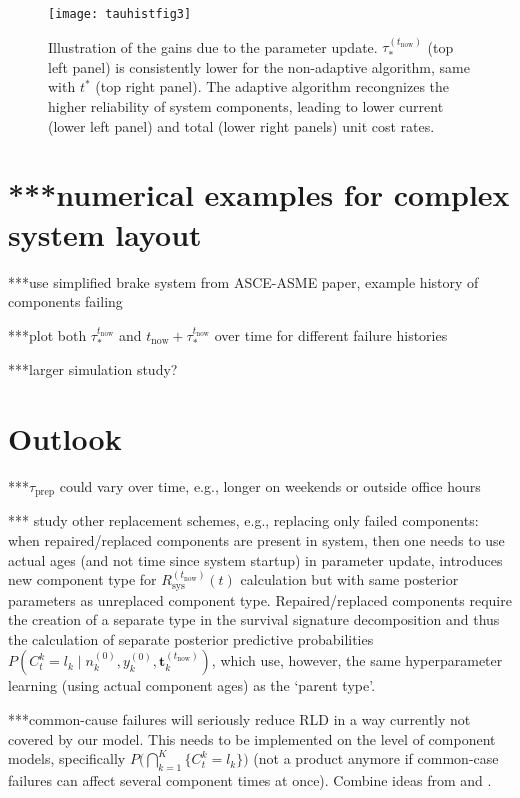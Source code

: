 \documentclass[authoryear]{elsarticle}
\renewcommand{\vec}[1]{{\bm#1}}
\newcommand{\uz}{^{(0)}} %
\def\ykz{y\uz_k}
\def\nkz{n\uz_k}
\def\tnow{t_\text{now}}
\newcommand{\Rsysnow}{R^{(t_\text{now})}_\text{sys}}
\def\vectknow{\vec{t}_k^{(\tnow)}}
\newcommand{\tausnow}{\tau_*^{(\tnow)}}
\newcommand{\tprep}{\tau_{\text{prep}}}
\begin{document}
\begin{figure}
\texttt{[image: tauhistfig3]}
\caption{Illustration of the gains due to the parameter update.
$\tausnow$ (top left panel) is consistently lower for the non-adaptive algorithm,
same with $t^*$ (top right panel).
The adaptive algorithm recongnizes the higher reliability of system components,
leading to lower current (lower left panel) and total (lower right panels) unit cost rates.}
\label{fig:tauhistfig3}
\end{figure}

\section{***numerical examples for complex system layout}
\label{sec:examples}

***use simplified brake system from ASCE-ASME paper, example history of components failing

***plot both $\tau_*^{\tnow}$ and $\tnow + \tau_*^{\tnow}$ over time for different failure histories

***larger simulation study?


\section{Outlook}
\label{sec:outlook}

***$\tprep$ could vary over time, e.g., longer on weekends or outside office hours

*** study other replacement schemes, e.g., replacing only failed components:
when repaired/replaced components are present in system,
then one needs to use actual ages (and not time since system startup) in parameter update,
introduces new component type for $\Rsysnow(t)$ calculation but with same posterior parameters as unreplaced component type.
Repaired/replaced components require the creation of a separate type in the survival signature decomposition
and thus the calculation of separate posterior predictive probabilities
$P(C^k_t = l_k \mid \nkz,\ykz,\vectknow)$,
which use, however, the same hyperparameter learning (using actual component ages) as the `parent type'.

***common-cause failures will seriously reduce RLD in a way currently not covered by our model.
This needs to be implemented on the level of component models,
specifically $P\Big( \bigcap_{k=1}^K \{ C^k_t = l_k\} \Big)$ 
(not a product anymore if common-case failures can affect several component times at once).
Combine ideas from \cite{2015:coolen-coolen-maturi} and \cite{Troffaes2014a}.
\end{document}
